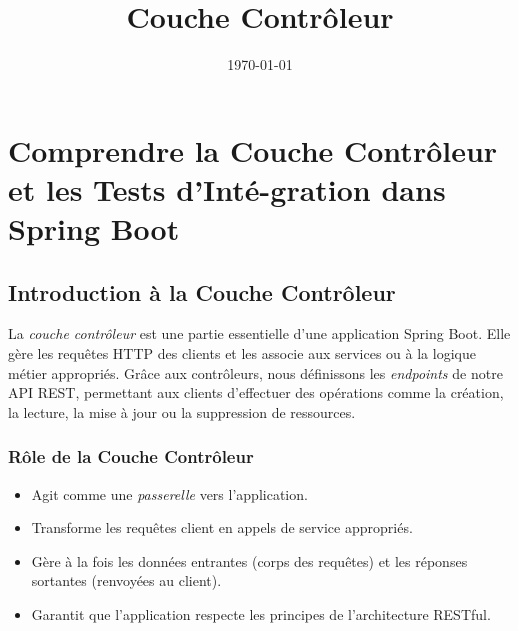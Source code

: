 \documentclass[a4paper,12pt]{article}
\title{Couche Contrôleur}
\date{\today}
\begin{document}
\maketitle

\section{Comprendre la Couche Contrôleur et les Tests d'Inté-gration dans Spring Boot}

\subsection{Introduction à la Couche Contrôleur}
La \textit{couche contrôleur} est une partie essentielle d'une application Spring Boot. Elle gère les requêtes HTTP des clients et les associe aux services ou à la logique métier appropriés. Grâce aux contrôleurs, nous définissons les \textit{endpoints} de notre API REST, permettant aux clients d'effectuer des opérations comme la création, la lecture, la mise à jour ou la suppression de ressources.

\subsubsection{Rôle de la Couche Contrôleur}
\begin{itemize}
    \item Agit comme une \textit{passerelle} vers l'application.
    \item Transforme les requêtes client en appels de service appropriés.
    \item Gère à la fois les données entrantes (corps des requêtes) et les réponses sortantes (renvoyées au client).
    \item Garantit que l'application respecte les principes de l'architecture RESTful.
\end{itemize}
\end{document}
